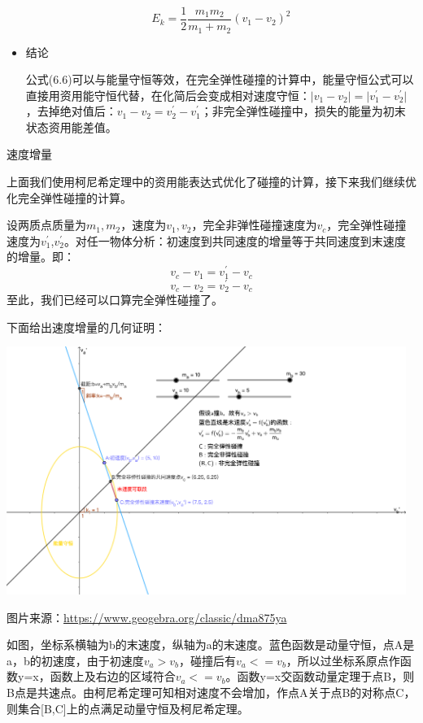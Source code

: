 \begin{problemset}
\begin{itemize}
		\begin{equation}
			E_k=\dfrac{1}{2}\dfrac{m_1m_2}{m_1+m_2}(v_1-v_2)^2
		\end{equation}
		\item 结论
		
		公式(6.6)可以与能量守恒等效，在完全弹性碰撞的计算中，能量守恒公式可以直接用资用能守恒代替，在化简后会变成相对速度守恒：$\lvert v_1-v_2 \rvert=\lvert v_1^\prime-v_2^\prime \rvert$，去掉绝对值后：$v_1-v_2=v_2^\prime-v_1^\prime $；非完全弹性碰撞中，损失的能量为初末状态资用能差值。
	\end{itemize}
	\newpage
	\item 速度增量
	
	上面我们使用柯尼希定理中的资用能表达式优化了碰撞的计算，接下来我们继续优化完全弹性碰撞的计算。
	
	设两质点质量为$m_1,m_2$，速度为$v_1,v_2$，完全非弹性碰撞速度为$v_c$，完全弹性碰撞速度为$v_1^\prime$,$v_2^\prime$。对任一物体分析：初速度到共同速度的增量等于共同速度到末速度的增量。即：
		\begin{equation}
			v_c-v_1=v_1^\prime-v_c
		\end{equation}
		\begin{equation}
			v_c-v_2=v_2^\prime-v_c
		\end{equation}
	至此，我们已经可以口算完全弹性碰撞了。

	下面给出速度增量的几何证明：
	\begin{center}
		\includegraphics[width=13cm]{media/61.png}
	\end{center}
	图片来源：\href{https://www.geogebra.org/classic/dma875ya}{https://www.geogebra.org/classic/dma875ya}
	
	如图，坐标系横轴为b的末速度，纵轴为a的末速度。蓝色函数是动量守恒，点A是a，b的初速度，由于初速度$v_a>v_b$，碰撞后有$v_a<=v_b$，所以过坐标系原点作函数y=x，函数上及右边的区域符合$v_a<=v_b$。函数y=x交函数动量定理于点B，则B点是共速点。由柯尼希定理可知相对速度不会增加，作点A关于点B的对称点C，则集合[B,C]上的点满足动量守恒及柯尼希定理。


\end{problemset}
